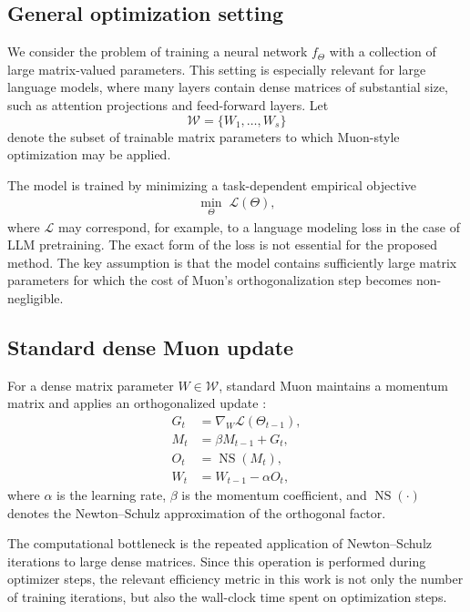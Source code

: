 \documentclass{article}
\begin{document}
\subsection{General optimization setting}

We consider the problem of training a neural network \(f_\Theta\) with a collection of large matrix-valued parameters. This setting is especially relevant for large language models, where many layers contain dense matrices of substantial size, such as attention projections and feed-forward layers. Let
\[
\mathcal{W} = \{W_1,\dots,W_s\}
\]
denote the subset of trainable matrix parameters to which Muon-style optimization may be applied.

The model is trained by minimizing a task-dependent empirical objective
\begin{align}
\min_{\Theta} \; \mathcal{L}(\Theta),
\end{align}
where \(\mathcal{L}\) may correspond, for example, to a language modeling loss in the case of LLM pretraining. The exact form of the loss is not essential for the proposed method. The key assumption is that the model contains sufficiently large matrix parameters for which the cost of Muon's orthogonalization step becomes non-negligible.

\subsection{Standard dense Muon update}

For a dense matrix parameter \(W \in \mathcal{W}\), standard Muon maintains a momentum matrix and applies an orthogonalized update \cite{jordan2024muon,liu2025muonscalablellmtraining}:
\begin{align}
G_t &= \nabla_W \mathcal{L}(\Theta_{t-1}), \\
M_t &= \beta M_{t-1} + G_t, \\
O_t &= \operatorname{NS}(M_t), \\
W_t &= W_{t-1} - \alpha O_t,
\end{align}
where \(\alpha\) is the learning rate, \(\beta\) is the momentum coefficient, and \(\operatorname{NS}(\cdot)\) denotes the Newton--Schulz approximation of the orthogonal factor.

The computational bottleneck is the repeated application of Newton--Schulz iterations to large dense matrices. Since this operation is performed during optimizer steps, the relevant efficiency metric in this work is not only the number of training iterations, but also the wall-clock time spent on optimization steps.
\end{document}
